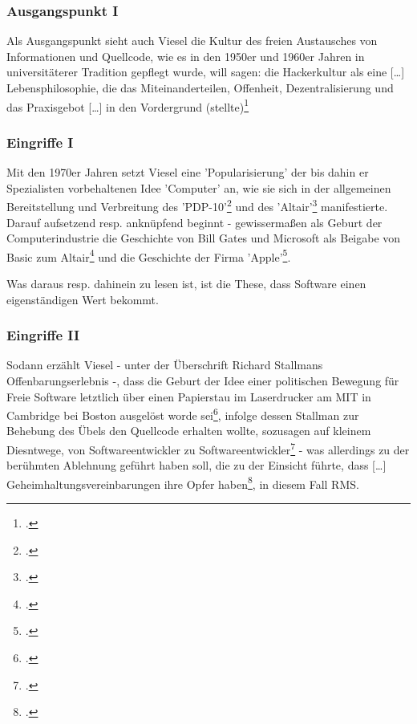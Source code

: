 \documentclass[DIV=calc,BCOR=5mm,11pt,headings=small,oneside,abstract=true, toc=bib]{scrartcl}
\begin{document}
\subsubsection{Ausgangspunkt I}
Als Ausgangspunkt sieht auch Viesel die Kultur des freien Austausches von
Informationen und Quellcode, wie es in den 1950er und 1960er Jahren in
universitäterer Tradition gepflegt wurde, will sagen: die
\glqq{}Hackerkultur\grqq{} als eine \glqq{}[\ldots] Lebensphilosophie, die das
Miteinanderteilen,  Offenheit, Dezentralisierung und das Praxisgebot [\ldots] in
den Vordergrund (stellte)\grqq{}\footcite[vgl.][11f]{Viesel2006a}

\subsubsection{Eingriffe I}

Mit den 1970er Jahren setzt Viesel eine 'Popularisierung' der bis dahin er
Spezialisten vorbehaltenen Idee 'Computer' an, wie sie sich in der allgemeinen
Bereitstellung und Verbreitung des
'PDP-10'\grqq{}\footcite[vgl.][14]{Viesel2006a} und des
'Altair'\footcite[vgl.][16]{Viesel2006a} manifestierte. Darauf aufsetzend resp.
anknüpfend beginnt - gewissermaßen als \glqq{}Geburt der
Computerindustrie\grqq{} die Geschichte von Bill Gates und Microsoft als Beigabe
von Basic zum Altair\footcite[vgl.][17f]{Viesel2006a} und die Geschichte der
Firma 'Apple'\footcite[vgl.][19]{Viesel2006a}. 

Was daraus resp. dahinein zu lesen ist, ist die These, dass Software einen
eigenständigen Wert bekommt.

\subsubsection{Eingriffe II}

Sodann erzählt Viesel - unter der Überschrift \glqq{}Richard Stallmans
Offenbarungserlebnis\grqq{} -, dass die \glqq{}Geburt\grqq{} der Idee einer
\glqq{}politischen Bewegung für Freie Software\grqq{} letztlich über einen
\glqq{}Papierstau im Laserdrucker\grqq{} am MIT in Cambridge bei Boston
ausgelöst worde sei\footcite[vgl.][20ff]{Viesel2006a}, infolge dessen Stallman
zur Behebung des Übels den Quellcode erhalten wollte, sozusagen auf kleinem
Diesntwege, \glqq{}von Softwareentwickler zu
Softwareentwickler\grqq{}\footcite[vgl.][21f]{Viesel2006a} - was allerdings zu
der berühmten Ablehnung geführt haben soll, die zu der Einsicht führte, dass
\glqq{}[\ldots] Geheimhaltungsvereinbarungen ihre Opfer
haben\grqq{}\footcite[vgl.][22]{Viesel2006a}, in diesem Fall RMS.
\end{document}
